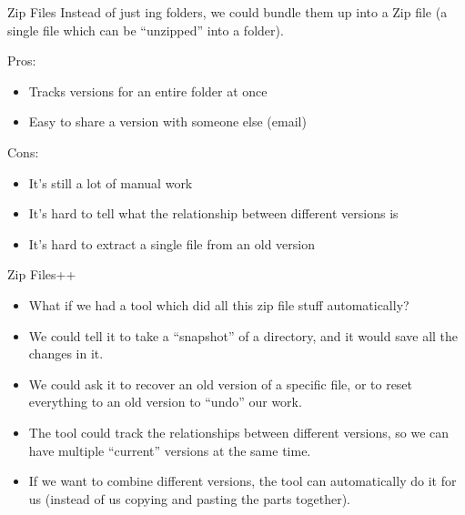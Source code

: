 \begin{frame}{Zip Files}
  Instead of just ing folders, we could bundle them up into a Zip file
  (a single file which can be \enquote{unzipped} into a folder).

  Pros:
  \begin{itemize}
    \item Tracks versions for an entire folder at once
    \item Easy to share a version with someone else (email)
  \end{itemize}

  Cons:
  \begin{itemize}
    \item It's still a lot of manual work
    \item It's hard to tell what the relationship between different versions
      is
    \item It's hard to extract a single file from an old version
  \end{itemize}
\end{frame}

\begin{frame}{Zip Files++}
  \begin{itemize}
    \item
      What if we had a tool which did all this zip file stuff automatically?
      \pause
    \item
      We could tell it to take a \enquote{snapshot} of a directory, and it
      would save all the changes in it.
      \pause
    \item
      We could ask it to recover an old version of a specific file, or to reset
      everything to an old version to \enquote{undo} our work.
      \pause
    \item
      The tool could track the relationships between different versions, so we
      can have multiple \enquote{current} versions at the same time.
      \pause
    \item
      If we want to combine different versions, the tool can automatically do
      it for us (instead of us copying and pasting the parts together).
  \end{itemize}
\end{frame}

